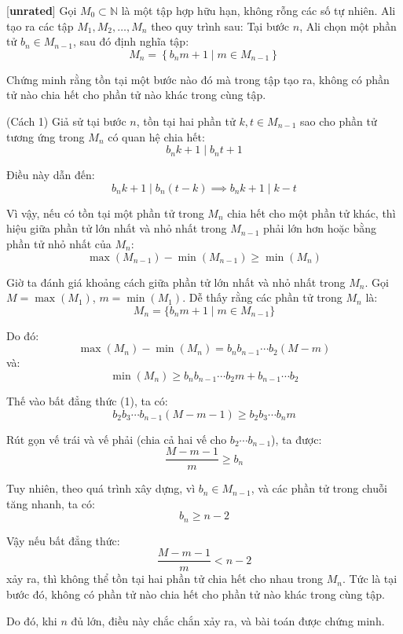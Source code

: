 \documentclass[../01-divisibility.tex]{subfiles}
\begin{document}
\begin{example*}\label{example:IRN-2015-N2}[\textbf{unrated}]
	Gọi \( M_0 \subset \mathbb{N} \) là một tập hợp hữu hạn, không rỗng các số tự nhiên. Ali tạo ra các tập \( M_1, M_2, \dots, M_n \) theo quy trình sau:
	Tại bước \( n \), Ali chọn một phần tử \( b_n \in M_{n-1} \), sau đó định nghĩa tập:
	\[
		M_n = \left\{ b_n m + 1 \mid m \in M_{n-1} \right\}
	\]
	
	Chứng minh rằng tồn tại một bước nào đó mà trong tập tạo ra, không có phần tử nào chia hết cho phần tử nào khác trong cùng tập.
\end{example*}

\begin{soln}(Cách 1)\footnotemark
	Giả sử tại bước \( n \), tồn tại hai phần tử \( k, t \in M_{n-1} \) sao cho phần tử tương ứng trong \( M_n \) có quan hệ chia hết:
	\[
		b_n k + 1 \mid b_n t + 1
	\]
	
	Điều này dẫn đến:
	\[
		b_n k + 1 \mid b_n(t - k) \implies b_n k + 1 \mid k - t
	\]
	
	Vì vậy, nếu có tồn tại một phần tử trong \( M_n \) chia hết cho một phần tử khác,
	thì hiệu giữa phần tử lớn nhất và nhỏ nhất trong \( M_{n-1} \) phải lớn hơn hoặc bằng phần tử nhỏ nhất của \( M_n \):
	\[
		\max(M_{n-1}) - \min(M_{n-1}) \geq \min(M_n) \tag{1}
	\]
	
	Giờ ta đánh giá khoảng cách giữa phần tử lớn nhất và nhỏ nhất trong \( M_n \). Gọi \( M = \max(M_1) \), \( m = \min(M_1) \).
	Dễ thấy rằng các phần tử trong \( M_n \) là:
	\[
		M_n = \{ b_n m + 1 \mid m \in M_{n-1} \}
	\]
	
	Do đó:
	\[
		\max(M_n) - \min(M_n) = b_n b_{n-1} \cdots b_2 (M - m)
	\]
	và:
	\[
		\min(M_n) \geq b_n b_{n-1} \cdots b_2 m + b_{n-1} \cdots b_2
	\]
	
	Thế vào bất đẳng thức (1), ta có:
	\[
		b_2 b_3 \cdots b_{n-1} (M - m - 1) \geq b_2 b_3 \cdots b_n m
	\]
	
	Rút gọn vế trái và vế phải (chia cả hai vế cho \( b_2 \cdots b_{n-1} \)), ta được:
	\[
		\frac{M - m - 1}{m} \geq b_n
	\]
	
	Tuy nhiên, theo quá trình xây dựng, vì \( b_n \in M_{n-1} \), và các phần tử trong chuỗi tăng nhanh, ta có:
	\[
		b_n \geq n - 2
	\]
	
	Vậy nếu bất đẳng thức:
	\[
		\frac{M - m - 1}{m} < n - 2
	\]
	xảy ra, thì không thể tồn tại hai phần tử chia hết cho nhau trong \( M_n \). Tức là tại bước đó, không có phần tử nào chia hết cho phần tử nào khác trong cùng tập.
	
	Do đó, khi \( n \) đủ lớn, điều này chắc chắn xảy ra, và bài toán được chứng minh.	
\end{soln}

\end{document}
